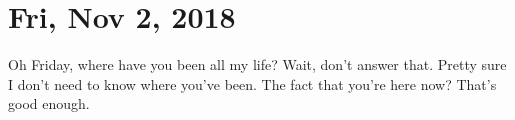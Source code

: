 \section{Fri, Nov 2, 2018}

Oh Friday, where have you been all my life? Wait, don't answer that. Pretty sure I
don't need to know where you've been. The fact that you're here now? That's good
enough.